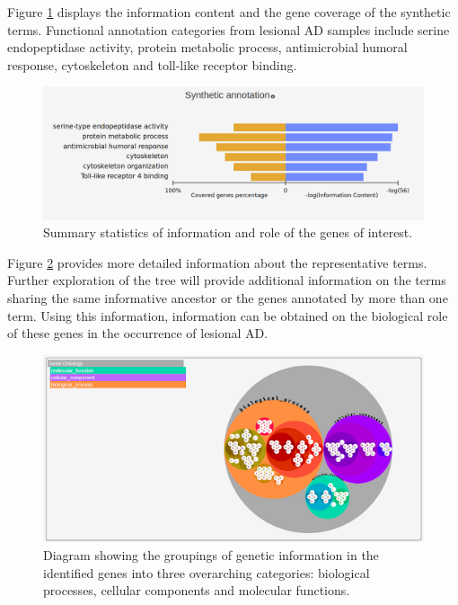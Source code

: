 \documentclass[journal, a4paper]{IEEEtran}
\begin{document}
Figure \ref{fig:synthetic-annotation} displays the information content and the gene coverage of the synthetic terms. Functional annotation categories from lesional AD samples include serine endopeptidase activity, protein metabolic process, antimicrobial humoral response, cytoskeleton and toll-like receptor binding.

\begin{figure} %
  \centering
  \includegraphics[width=\textwidth]{synthetic-annotation.png}
  \caption{Summary statistics of information and role of the genes of interest.}
  \label{fig:synthetic-annotation}
\end{figure}


Figure \ref{fig:gene-ontology} provides more detailed information about the representative terms. Further exploration of the tree will provide additional information on the terms sharing the same informative ancestor or the genes annotated by more than one term. Using this information, information can be obtained on the biological role of these genes in the occurrence of lesional AD.

\begin{figure}[!htp]
  \begin{center}
    \begin{minipage}{0.5 \textwidth}
      \centering
      \includegraphics[width=\textwidth]{gene-ontology.png}
      \caption{Diagram showing the groupings of genetic information in the identified genes into three overarching categories: biological processes, cellular components and molecular functions.}
      \label{fig:gene-ontology}
    \end{minipage}
  \end{center}
\end{figure}
\end{document}
